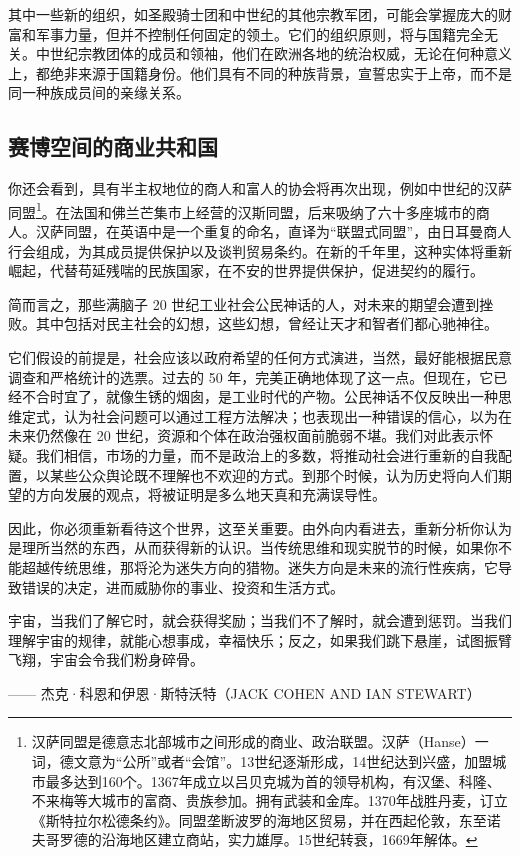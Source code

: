 其中一些新的组织，如圣殿骑士团和中世纪的其他宗教军团，可能会掌握庞大的财富和军事力量，但并不控制任何固定的领土。它们的组织原则，将与国籍完全无关。中世纪宗教团体的成员和领袖，他们在欧洲各地的统治权威，无论在何种意义上，都绝非来源于国籍身份。他们具有不同的种族背景，宣誓忠实于上帝，而不是同一种族成员间的亲缘关系。


\subsection{赛博空间的商业共和国}
你还会看到，具有半主权地位的商人和富人的协会将再次出现，例如中世纪的汉萨同盟\footnote{汉萨同盟是德意志北部城市之间形成的商业、政治联盟。汉萨（Hanse）一词，德文意为“公所”或者“会馆”。13世纪逐渐形成，14世纪达到兴盛，加盟城市最多达到160个。1367年成立以吕贝克城为首的领导机构，有汉堡、科隆、不来梅等大城市的富商、贵族参加。拥有武装和金库。1370年战胜丹麦，订立《斯特拉尔松德条约》。同盟垄断波罗的海地区贸易，并在西起伦敦，东至诺夫哥罗德的沿海地区建立商站，实力雄厚。15世纪转衰，1669年解体。}。在法国和佛兰芒集市上经营的汉斯同盟，后来吸纳了六十多座城市的商人。汉萨同盟，在英语中是一个重复的命名，直译为“联盟式同盟”，由日耳曼商人行会组成，为其成员提供保护以及谈判贸易条约。在新的千年里，这种实体将重新崛起，代替苟延残喘的民族国家，在不安的世界提供保护，促进契约的履行。

简而言之，那些满脑子 20 世纪工业社会公民神话的人，对未来的期望会遭到挫败。其中包括对民主社会的幻想，这些幻想，曾经让天才和智者们都心驰神往。

它们假设的前提是，社会应该以政府希望的任何方式演进，当然，最好能根据民意调查和严格统计的选票。过去的 50 年，完美正确地体现了这一点。但现在，它已经不合时宜了，就像生锈的烟囱，是工业时代的产物。公民神话不仅反映出一种思维定式，认为社会问题可以通过工程方法解决；也表现出一种错误的信心，以为在未来仍然像在 20 世纪，资源和个体在政治强权面前脆弱不堪。我们对此表示怀疑。我们相信，市场的力量，而不是政治上的多数，将推动社会进行重新的自我配置，以某些公众舆论既不理解也不欢迎的方式。到那个时候，认为历史将向人们期望的方向发展的观点，将被证明是多么地天真和充满误导性。

因此，你必须重新看待这个世界，这至关重要。由外向内看进去，重新分析你认为是理所当然的东西，从而获得新的认识。当传统思维和现实脱节的时候，如果你不能超越传统思维，那将沦为迷失方向的猎物。迷失方向是未来的流行性疾病，它导致错误的决定，进而威胁你的事业、投资和生活方式。

\begin{tcolorbox}
\kaishu 宇宙，当我们了解它时，就会获得奖励；当我们不了解时，就会遭到惩罚。当我们理解宇宙的规律，就能心想事成，幸福快乐；反之，如果我们跳下悬崖，试图振臂飞翔，宇宙会令我们粉身碎骨。
\begin{flushright}
—— 杰克·科恩和伊恩·斯特沃特（JACK COHEN AND IAN STEWART）
\end{flushright}
\end{tcolorbox}

